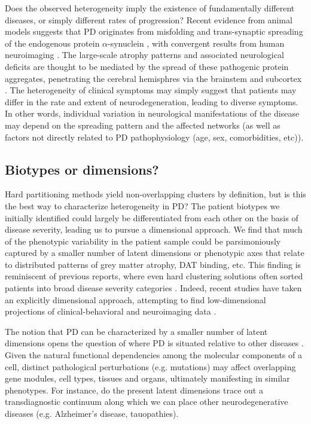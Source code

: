 \documentclass[12pt,aps,pra,reprint,showkeys]{revtex4-1}
\begin{document}
Does the observed heterogeneity imply the existence of fundamentally different diseases, or simply different rates of progression?
Recent evidence from animal models suggests that PD originates from misfolding and trans-synaptic spreading of the endogenous protein $\alpha$-synuclein \citep{luk2012science}, with convergent results from human neuroimaging \citep{yau2017network, zheng2019plosbiol}.
The large-scale atrophy patterns and associated neurological deficits are thought to be mediated by the spread of these pathogenic protein aggregates, penetrating the cerebral hemisphres via the brainstem and subcortex \citep{warren2013trendsneurosci}.
The heterogeneity of clinical symptoms may simply suggest that patients may differ in the rate and extent of neurodegeneration, leading to diverse symptoms.
In other words, individual variation in neurological manifestations of the disease may depend on the spreading pattern and the affected networks (as well as factors not directly related to PD pathophysiology (age, sex, comorbidities, etc)).

\subsection*{Biotypes or dimensions?}

Hard partitioning methods yield non-overlapping clusters by definition, but is this the best way to characterize heterogeneity in PD?
The patient biotypes we initially identified could largely be differentiated from each other on the basis of disease severity, leading us to pursue a dimensional approach.
We find that much of the phenotypic variability in the patient sample could be parsimoniously captured by a smaller number of latent dimensions or phenotypic axes that relate to distributed patterns of grey matter atrophy, DAT binding, etc.
This finding is reminiscent of previous reports, where even hard clustering solutions often sorted patients into broad disease severity categories \citep{fereshtehnejad2017clinical, thenganatt2014jamaneurol, erro2016parkinsonismrelatd, lawton2015jparkinsondis, lawton2018jneurolneurosurgpsychiatry}.
Indeed, recent studies have taken an explicitly dimensional approach, attempting to find low-dimensional projections of clinical-behavioral and neuroimaging data \citep{kebets2019somatosensory, sandor2019biorxiv, tang2019reconciling}.

The notion that PD can be characterized by a smaller number of latent dimensions opens the question of where PD is situated relative to other diseases \citep{barabasi2011natrevgenet}. 
Given the natural functional dependencies among the molecular components of a cell, distinct pathological perturbations (e.g. mutations) may affect overlapping gene modules, cell types, tissues and organs, ultimately manifesting in similar phenotypes.
For instance, do the present latent dimensions trace out a transdiagnostic continuum along which we can place other neurodegenerative diseases (e.g. Alzheimer's disease, tauopathies).
\end{document}
